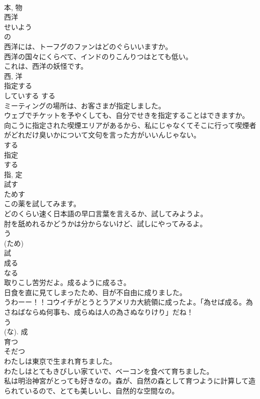 \documentclass[8pt]{extreport}
\begin{document}
\begin{CJK}{UTF8}{min}
\\	本, 物	
\\	西洋	
\\	せいよう	
\\	の 
\\	西洋には、トーフグのファンはどのぐらいいますか。	
\\	西洋の国々にくらべて、インドのりこんりつはとても低い。	
\\	これは、西洋の妖怪です。	
\\	西, 洋	
\\	指定する	
\\	していする	する 
\\	ミーティングの場所は、お客さまが指定しました。	
\\	ウェブでチケットを予やくしても、自分でせきを指定することはできますか。	
\\	向こうに指定された喫煙エリアがあるから、私にじゃなくてそこに行って喫煙者がどれだけ臭いかについて文句を言った方がいいんじゃない。	
\\	する 
\\	指定 
\\	する 
\\	指, 定	
\\	試す	
\\	ためす	
\\	この薬を試してみます。	
\\	どのくらい速く日本語の早口言葉を言えるか、試してみようよ。	
\\	肘を舐めれるかどうかは分からないけど、試しにやってみるよ。	
\\	う 
\\	(ため) 
\\	試	
\\	成る	
\\	なる	
\\	取りこし苦労だよ。成るように成るさ。	
\\	日食を直に見てしまったため、目が不自由に成りました。	
\\	うわーー！！コウイチがとうとうアメリカ大統領に成ったよ。「為せば成る。為さねばならぬ何事も、成らぬは人の為さぬなりけり」だね！	
\\	う 
\\	(な).	成	
\\	育つ	
\\	そだつ	
\\	わたしは東京で生まれ育ちました。	
\\	わたしはとてもきびしい家ていで、ベーコンを食べて育ちました。	
\\	私は明治神宮がとっても好きなの。森が、自然の森として育つように計算して造られているので、とても美しいし、自然的な空間なの。	

\end{CJK}
\end{document}
